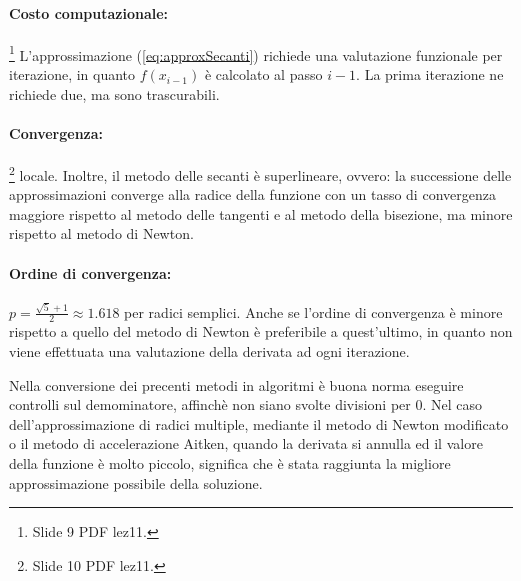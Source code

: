 \paragraph{Costo computazionale:}\footnote{Slide 9 PDF lez11.}
L'approssimazione (\ref{eq:approxSecanti}) richiede una valutazione funzionale per iterazione, in quanto $f(x_{i-1})$ è calcolato al passo $i-1$. La prima iterazione ne richiede due, ma sono trascurabili.

\paragraph{Convergenza:}\footnote{Slide 10 PDF lez11.} locale. Inoltre, il metodo delle secanti è superlineare, ovvero: la successione delle approssimazioni converge alla radice della funzione con un tasso di convergenza maggiore rispetto al metodo delle tangenti e al metodo della bisezione, ma minore rispetto al metodo di Newton.

\paragraph{Ordine di convergenza:} $p = \frac{\sqrt{5}+1}{2}\approx 1.618$ per radici semplici. Anche se l'ordine di convergenza è minore rispetto a quello del metodo di Newton è preferibile a quest'ultimo, in quanto non viene effettuata una valutazione della derivata ad ogni iterazione.

\begin{remark}
	Nella conversione dei precenti metodi in algoritmi è buona norma eseguire controlli sul demominatore, affinchè non siano svolte divisioni per 0. Nel caso dell'approssimazione di radici multiple, mediante il metodo di Newton modificato o il metodo di accelerazione Aitken, quando la derivata si annulla ed il valore della funzione è molto piccolo, significa che è stata raggiunta la migliore approssimazione possibile della soluzione.
\end{remark}

